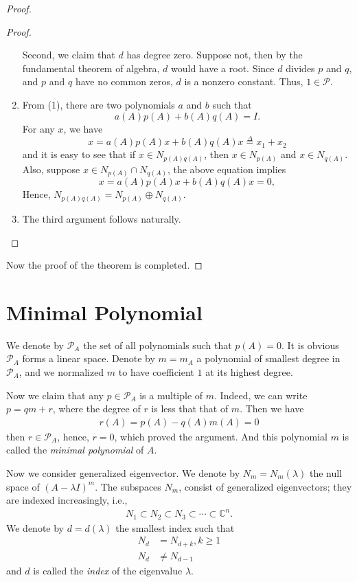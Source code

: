 \documentclass[11pt]{book}
\theoremstyle{definition}
\numberwithin{equation}{subsection}
\begin{document}
\begin{proof}
\begin{proof}
\begin{enumerate}[label=(\arabic*)]
    Second, we claim that $d$ has degree zero. Suppose not, then by the fundamental theorem of algebra, $d$ would have a root. Since $d$ divides $p$ and $q$, and $p$ and $q$ have no common zeros, $d$ is a nonzero constant. Thus, $1\in \mathcal{P}$.
    \item From (1), there are two polynomials $a$ and $b$ such that 
    $$a(A)p(A) + b(A)q(A) = I.$$
    For any $x$, we have
    $$x = a(A)p(A)x + b(A)q(A)x \overset{\Delta}{=} x_1 + x_2 $$
    and it is easy to see that if $x\in N_{p(A)q(A)}$, then $x\in N_{p(A)}$ and $x\in N_{q(A)}$. Also, suppose $x\in N_{p(A)}\cap N_{q(A)}$, the above equation implies 
    $$x = a(A)p(A)x + b(A)q(A)x = 0,$$
    Hence, $N_{p(A)q(A)} = N_{p(A)} \oplus N_{q(A)}$.
    \item The third argument follows naturally.
\end{enumerate}
\end{proof}
Now the proof of the theorem is completed.
\end{proof}

\medskip

\section{Minimal Polynomial}

We denote by $\mathcal{P}_A$ the set of all polynomials such that $p(A) = 0$. It is obvious $\mathcal{P}_A$ forms a linear space. Denote by $m = m_A$ a polynomial of smallest degree in $\mathcal{P}_A$, and we normalized $m$ to have coefficient $1$ at its highest degree. 

Now we claim that any $p\in\mathcal{P}_A$ is a multiple of $m$. Indeed, we can write $p = qm +r$, where the degree of $r$ is less that that of $m$. Then we have 
\begin{align*}
    r(A) = p(A) - q(A)m(A) = 0
\end{align*}
then $r\in\mathcal{P}_A$, hence, $r = 0$, which proved the argument. And this polynomial $m$ is called the \emph{minimal polynomial} of $A$.

Now we consider generalized eigenvector. We denote by $N_m = N_m(\lambda)$ the null space of $(A - \lambda I)^m$. The subspaces
$N_m$, consist of generalized eigenvectors; they are indexed increasingly, i.e.,
\begin{align*}
    N_1\subset N_2 \subset N_3 \subset \cdots \subset \mathbb{C}^n.
\end{align*}
We denote by $d = d(\lambda)$ the smallest index such that
\begin{align*}
    N_d & = N_{d+k}, k\geq 1 \\
    N_d & \neq N_{d-1}
\end{align*}
and $d$ is called the \emph{index} of the eigenvalue $\lambda$.
\end{document}
